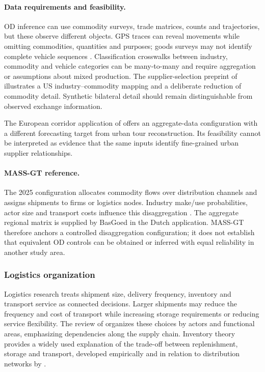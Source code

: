 \paragraph{Data requirements and feasibility.}
OD inference can use commodity surveys, trade matrices, counts and trajectories,
but these observe different objects. GPS traces can reveal movements while
omitting commodities, quantities and purposes; goods surveys may not identify
complete vehicle sequences \parencite{shoman2023}. Classification crosswalks
between industry, commodity and vehicle categories can be many-to-many and
require aggregation or assumptions about mixed production. The supplier-selection
preprint of \textcite{ismael2026} illustrates a US industry--commodity mapping
and a deliberate reduction of commodity detail. Synthetic bilateral detail
should remain distinguishable from observed exchange information.

The European corridor application of \textcite{petri2016} offers an aggregate-data
configuration with a different forecasting target from urban tour
reconstruction. Its feasibility cannot be interpreted as evidence that the same
inputs identify fine-grained urban supplier relationships.


\paragraph{MASS-GT reference.}
The 2025 configuration allocates commodity flows over distribution channels and
assigns shipments to firms or logistics nodes. Industry make/use probabilities,
actor size and transport costs influence this disaggregation
\parencite{massgt2025}. The aggregate regional matrix is supplied by BasGoed in
the Dutch application. MASS-GT therefore anchors a controlled disaggregation
configuration; it does not establish that equivalent OD controls can be obtained
or inferred with equal reliability in another study area.

\subsubsection{Logistics organization}\label{sec:f4}
Logistics research treats shipment size, delivery frequency, inventory and
transport service as connected decisions. Larger shipments may reduce the
frequency and cost of transport while increasing storage requirements or
reducing service flexibility. The review of \textcite{tavasszy2020} organizes
these choices by actors and functional areas, emphasizing dependencies along the
supply chain. Inventory theory provides a widely used explanation of the
trade-off between replenishment, storage and transport, developed empirically
and in relation to distribution networks by \textcite{combes2012,combes2016}.

